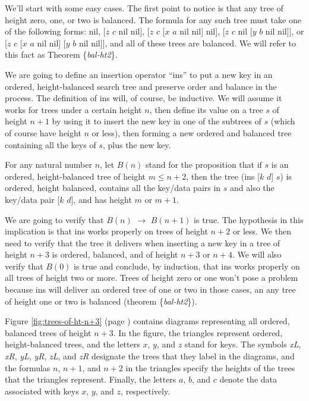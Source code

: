 We'll start with some easy cases.
The first point to notice is that any tree of height zero, one, or two is balanced.
The formula for any such tree must take one of the following forms:
nil, [$z$ $c$ nil nil],
[$z$ $c$ [$x$ $a$ nil nil] nil], [$z$ $c$ nil [$y$ $b$ nil nil]],
or [$z$ $c$ [$x$ $a$ nil nil] [$y$ $b$ nil nil]],
and all of these trees are balanced.
We will refer to this fact as
Theorem \{\emph{bal-ht2}\}.

We are going to define an insertion operator ``ins''
to put a new key in an ordered, height-balanced
search tree and preserve order and balance in the process.
The definition of ins will, of course, be inductive.
We will assume it works for trees under a certain height $n$,
then define its value on a tree $s$ of height $n+1$ by using it to insert
the new key in one of the subtrees of $s$
(which of course have height $n$ or less),
then forming a new ordered and balanced tree
containing all the keys of $s$, plus the new key.

\label{ins-induction-predicate}
For any natural number $n$, let $B(n)$ stand for the
proposition that
if $s$ is an ordered, height-balanced tree
of height $m \le n+2$, then the tree (ins [$k$ $d$] $s$)
is ordered, height balanced, contains all the key/data pairs in $s$
and also the key/data pair [$k$ $d$], and has height $m$ or $m+1$.

We are going to verify that
\label{zig-zag-induction}$B(n)$ $\rightarrow$ $B(n+1)$ is true.
The hypothesis in this implication is that
ins works properly on trees of height $n+2$ or less.
We then need to verify that the tree it delivers
when inserting a new key in a tree of height $n+3$
is ordered, balanced, and of height $n+3$ or $n+4$.
We will also verify that $B(0)$ is true and conclude,
by induction, that ins works properly on all trees of height
two or more. Trees of height zero or one won't pose a problem
because ins will deliver an ordered tree of one or two in those
cases, an any tree of height one or two is balanced
(theorem \{\emph{bal-ht2}\}).

Figure \ref{fig:trees-of-ht-n+3} (page \pageref{fig:trees-of-ht-n+3})
contains diagrams representing all ordered, balanced trees of height $n+3$.
In the figure, the triangles represent ordered, height-balanced trees,
and the letters $x$, $y$, and $z$ stand for keys.
The symbols \emph{xL}, \emph{xR}, \emph{yL}, \emph{yR},
\emph{zL}, and \emph{zR}
designate the trees that they label in the diagrams,
and the formulas $n$, $n+1$, and $n+2$ in the triangles specify
the heights of the trees that the triangles represent.
Finally, the letters $a$, $b$, and $c$ denote the data
associated with keys $x$, $y$, and $z$, respectively.

